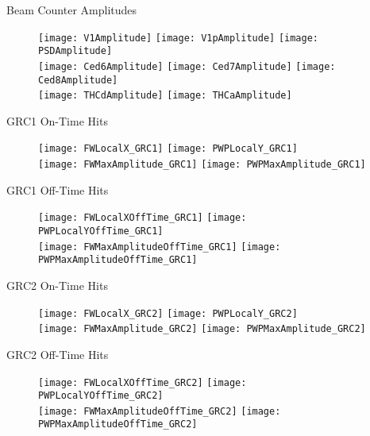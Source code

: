\documentclass[11pt]{beamer}
\begin{document}
\begin{frame}{Beam Counter Amplitudes}
\begin{figure}
\centering
\texttt{[image: V1Amplitude]} 
\texttt{[image: V1pAmplitude]}
\texttt{[image: PSDAmplitude]} \\
\texttt{[image: Ced6Amplitude]}
\texttt{[image: Ced7Amplitude]} 
\texttt{[image: Ced8Amplitude]} \\
\texttt{[image: THCdAmplitude]} 
\texttt{[image: THCaAmplitude]} 
\end{figure}
\end{frame}

\begin{frame}{GRC1 On-Time Hits}
\begin{figure}
\centering
\texttt{[image: FWLocalX\_GRC1]}
\texttt{[image: PWPLocalY\_GRC1]} \\
\texttt{[image: FWMaxAmplitude\_GRC1]}
\texttt{[image: PWPMaxAmplitude\_GRC1]} 
\end{figure}
\end{frame}

\begin{frame}{GRC1 Off-Time Hits}
\begin{figure}
\centering
\texttt{[image: FWLocalXOffTime\_GRC1]}
\texttt{[image: PWPLocalYOffTime\_GRC1]} \\
\texttt{[image: FWMaxAmplitudeOffTime\_GRC1]}
\texttt{[image: PWPMaxAmplitudeOffTime\_GRC1]} 
\end{figure}
\end{frame}

\begin{frame}{GRC2 On-Time Hits}
\begin{figure}
\centering
\texttt{[image: FWLocalX\_GRC2]}
\texttt{[image: PWPLocalY\_GRC2]} \\
\texttt{[image: FWMaxAmplitude\_GRC2]}
\texttt{[image: PWPMaxAmplitude\_GRC2]} 
\end{figure}
\end{frame}

\begin{frame}{GRC2 Off-Time Hits}
\begin{figure}
\centering
\texttt{[image: FWLocalXOffTime\_GRC2]}
\texttt{[image: PWPLocalYOffTime\_GRC2]} \\
\texttt{[image: FWMaxAmplitudeOffTime\_GRC2]}
\texttt{[image: PWPMaxAmplitudeOffTime\_GRC2]} 
\end{figure}
\end{frame}
\end{document}
